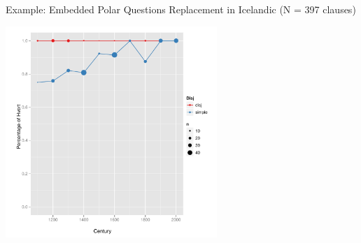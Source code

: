 \documentclass[hyperref={pdfpagelabels=false}]{beamer}
\begin{document}
\begin{frame}{Example: Embedded Polar Questions}
Replacement in Icelandic (N = 397 clauses)
\begin{center}
 
\includegraphics[width=0.6\textwidth]{whetherifIce.pdf}

\end{center}
\end{frame}

%
%
%
\end{document}
